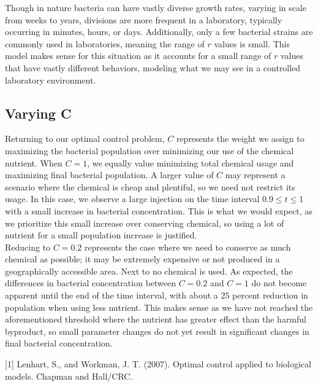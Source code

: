 \documentclass[10pt]{article}
\theoremstyle{exmp}
\begin{document}
\noindent Though in nature bacteria can have vastly diverse growth rates, varying in scale from weeks to years, divisions are more frequent in a laboratory, typically occurring in minutes, hours, or days. Additionally, only a few bacterial strains are commonly used in laboratories, meaning the range of $r$ values is small. This model makes sense for this situation as it accounts for a small range of $r$ values that have vastly different behaviors, modeling what we may see in a controlled laboratory environment. \\

\subsection{Varying C}

\noindent Returning to our optimal control problem, $C$ represents the weight we assign to maximizing the bacterial population over minimizing our use of the chemical nutrient. When $C = 1$, we equally value minimizing total chemical usage and maximizing final bacterial population. A larger value of $C$ may represent a scenario where the chemical is cheap and plentiful, so we need not restrict its usage. In this case, we observe a large injection on the time interval $0.9 \leq t \leq 1$ with a small increase in bacterial concentration. This is what we would expect, as we prioritize this small increase over conserving chemical, so using a lot of nutrient for a small population increase is justified. \\

\noindent Reducing to $C = 0.2$ represents the case where we need to conserve as much chemical as possible; it may be extremely expensive or not produced in a geographically accessible area. Next to no chemical is used. As expected, the differences in bacterial concentration between $C = 0.2$ and $C = 1$ do not become apparent until the end of the time interval, with about a $25$ percent reduction in population when using less nutrient. This makes sense as we have not reached the aforementioned threshold where the nutrient has greater effect than the harmful byproduct, so small parameter changes do not yet result in significant changes in final bacterial concentration.







\begin{thebibliography}{9}\raggedright
[1] Lenhart, S., and Workman, J. T. (2007). Optimal control applied to biological models. Chapman and Hall/CRC. 
\end{thebibliography}





\end{document}
